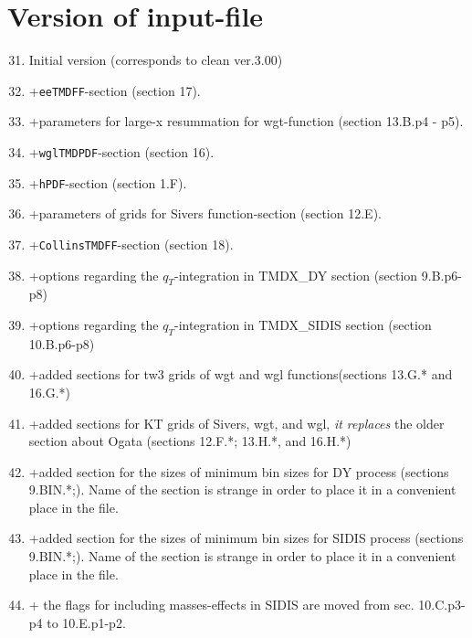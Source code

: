\documentclass[prd,nofootinbib,eqsecnum,final]{revtex4}
\renewcommand{\(}{\left(}
\renewcommand{\)}{\right)}
\renewcommand{\[}{\left[}
\renewcommand{\]}{\right]}
\begin{document}
\section{Version of input-file}
\begin{enumerate}
\setcounter{enumi}{30}
\item Initial version (corresponds to clean ver.3.00)
\item +\texttt{eeTMDFF}-section (section 17).
\item +parameters for large-x resummation for wgt-function (section 13.B.p4 - p5).
\item +\texttt{wglTMDPDF}-section (section 16).
\item +\texttt{hPDF}-section (section 1.F).
\item +parameters of grids for Sivers function-section (section 12.E).
\item +\texttt{CollinsTMDFF}-section (section 18).
\item +options regarding the $q_T$-integration in TMDX\_DY section (section 9.B.p6-p8)
\item +options regarding the $q_T$-integration in TMDX\_SIDIS section (section 10.B.p6-p8)
\item +added sections for tw3 grids of wgt and wgl functions(sections 13.G.* and 16.G.*)
\item +added sections for KT grids of Sivers, wgt, and wgl, \textit{it replaces} the older section about Ogata (sections 12.F.*; 13.H.*, and 16.H.*)
\item +added section for the sizes of minimum bin sizes for DY process (sections 9.BIN.*;). Name of the section is strange in order to place it in a convenient place in the file.
\item +added section for the sizes of minimum bin sizes for SIDIS process (sections 9.BIN.*;). Name of the section is strange in order to place it in a convenient place in the file.
\item + the flags for including masses-effects in SIDIS are moved from sec. 10.C.p3-p4 to 10.E.p1-p2.
\end{enumerate}
\end{document}
